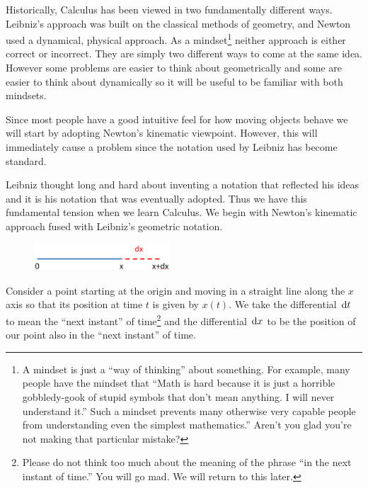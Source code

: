 Historically, Calculus has been viewed in two fundamentally different
ways. Leibniz's approach was built on the classical methods of
geometry, and Newton used a dynamical, physical approach. As a
mindset\footnote{A mindset is just a ``way of thinking'' about
  something. For example, many people have the mindset that ``Math is
  hard because it is just a horrible gobbledy-gook of stupid symbols
  that don't mean anything.  I will never understand it.'' Such a
  mindset prevents many otherwise very capable people from
  understanding even the simplest mathematics.''  Aren't you glad
  you're not making that particular mistake?} neither approach is
either correct or incorrect. They are simply two different ways to
come at the same idea. However some problems are easier to think about
geometrically and some are easier to think about dynamically so it
will be useful to be familiar with both mindsets.

Since most people have a good intuitive feel for how moving objects
behave we will start by adopting Newton's kinematic
viewpoint. However, this will immediately cause a problem since the
notation used by Leibniz has become standard.

Leibniz thought long and hard about inventing a notation that
reflected his ideas and it is his notation that was eventually
adopted. Thus we have this fundamental tension when we learn
Calculus. We begin with Newton's kinematic approach fused with
Leibniz's geometric notation.


\begin{figure}
\captionsetup{labelformat=empty}
\centerline{\includegraphics*[height=.5in,width=2in]{Figures/DifferentialLine}}
\label{fig:DifferentialLine}
\end{figure}
Consider a point starting at the origin and moving in a straight line
along the $x$ axis so that its position at time $t$ is given by
$x(t).$ We take the differential $\thinspace{\rm d}t$ to mean the ``next instant''
of time\footnote{Please do not think too much about the meaning of the
  phrase ``in the next instant of time.'' You will go mad. We will
  return to this later.}  and the differential $\thinspace{\rm d}x$ to be the
position of our point also in the ``next instant'' of time.

